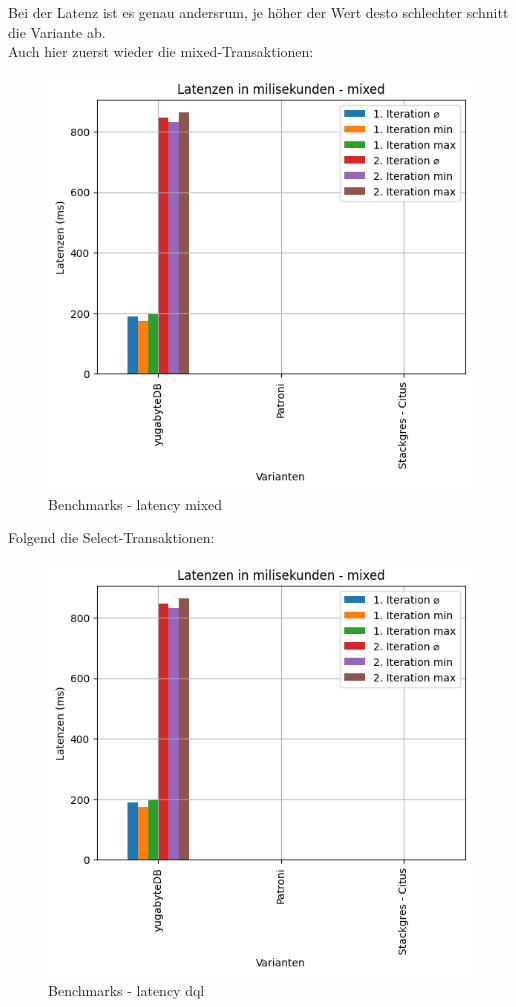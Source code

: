 \begin{flushleft}
    Bei der Latenz ist es genau andersrum, je höher der Wert desto schlechter schnitt die Variante ab.\\
    Auch hier zuerst wieder die mixed-Transaktionen:
    \begin{figure}[H]
        \centering
        \includegraphics[width=1\linewidth]{source/pandas_data_chart_plotter/latency_mixed}
        \caption{Benchmarks - latency mixed}
        \label{fig:latency_mixed}
    \end{figure}

    Folgend die Select-Transaktionen:
    \begin{figure}[H]
        \centering
        \includegraphics[width=1\linewidth]{source/pandas_data_chart_plotter/latency_dql}
        \caption{Benchmarks - latency dql}
        \label{fig:latency_dql}
    \end{figure}
\end{flushleft}
